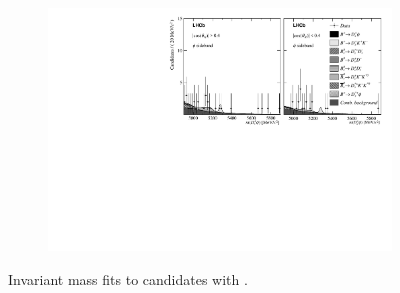 \begin{figure}[!h]
\begin{subfigure}[t]{1.0\textwidth}
    \end{subfigure}
    \begin{subfigure}[t]{1.0\textwidth}
        \centering
        \includegraphics[width=1.0\textwidth]{figs/Appendix_FitCategories/canvas_DsPhiSide_Ds2KPiPi_both_summed_splitHel_splitKKPi_s21_s21r1_s24_s26.pdf}\\
    \end{subfigure}
    \caption{Invariant mass fits to \decay{\Bp}{\Dsp\phiz} candidates with \decay{\Dsp}{\Kp\pim\pip}.}
    \label{fig:app_fit_Kpipi}
\end{figure}

